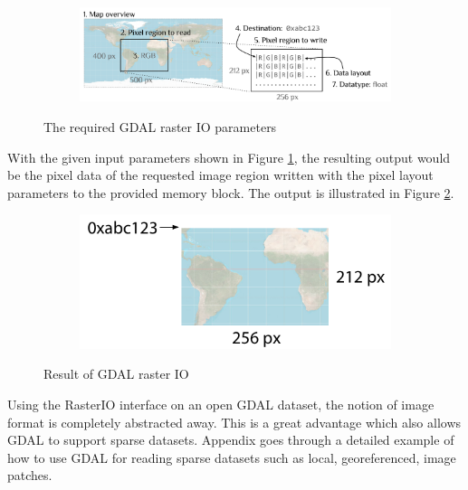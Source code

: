 \begin{figure}[htbp]
    \centering
    \begin{subfigure}[bt]{1.0\textwidth}
        \includegraphics[width=\textwidth]{figures/implementation/pipeline/gdalio.png}
    \end{subfigure}
    \caption{The required GDAL raster IO parameters}
    \label{fig:gdalio}
\end{figure}

With the given input parameters shown in Figure \ref{fig:gdalio}, the resulting output would be the pixel data of the requested image region written with the pixel layout parameters to the provided memory block. The output is illustrated in Figure \ref{fig:gdalioresult}.

\begin{figure}[htbp]
    \centering
    \begin{subfigure}[bt]{0.5\textwidth}
        \includegraphics[width=\textwidth]{figures/implementation/pipeline/gdalioresult.pdf}
    \end{subfigure}
    \caption{Result of GDAL raster IO}
    \label{fig:gdalioresult}
\end{figure}

Using the RasterIO interface on an open GDAL dataset, the notion of image format is completely abstracted away. This is a great advantage which also allows GDAL to support sparse datasets. Appendix  goes through a detailed example of how to use GDAL for reading sparse datasets such as local, georeferenced, image patches.

